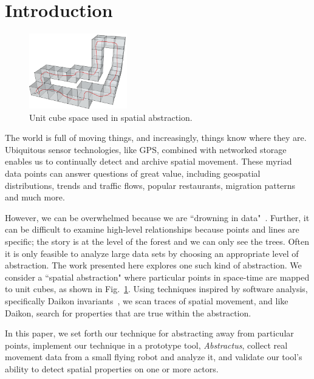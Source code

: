 \section{Introduction}

\begin{figure}
  \vspace{-0.4cm}
  \centering
  \includegraphics[width=0.38\textwidth]{./figures/path_overview}
  \caption{Unit cube space used in spatial abstraction.}
  \label{fig:unitCubes}
\end{figure}

The world is full of moving things, and increasingly, things know where they are. 
Ubiquitous sensor technologies, like GPS, combined with networked storage enables us to continually detect and archive spatial movement.
These myriad data points can answer questions of great value, including geospatial distributions, trends and traffic flows, popular restaurants, migration patterns and much more.


However, we can be overwhelmed because we are ``drowning in data"~\cite{morse1993drowning}.
Further, it can be difficult to examine high-level relationships because points and lines are specific; the story is at the level of the forest and we can only see the trees.  
Often it is only feasible to analyze large data sets by choosing an appropriate level of abstraction.
The work presented here explores one such kind of abstraction.
We consider a ``spatial abstraction" where particular points in space-time are mapped to unit cubes, as shown in Fig.~\ref{fig:unitCubes}.
Using techniques inspired by software analysis, specifically Daikon invariants~\cite{kataoka2001automated}, we scan traces of spatial movement, and like Daikon, search for properties that are true within the abstraction.  

In this paper, we set forth our technique for abstracting away from particular points, 
implement our technique in a prototype tool, \emph{Abstractus},
collect real movement data from a small flying robot and analyze it, 
and validate our tool's ability to detect spatial properties on one or more actors.

